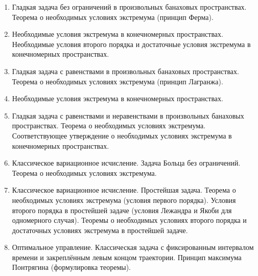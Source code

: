 % 
%

\begin{enumerate}
\item Гладкая задача без ограничений в произвольных банаховых пространствах. Теорема о необходимых условиях экстремума (принцип Ферма).

\item Необходимые условия экстремума в конечномерных пространствах. Необходимые условия второго порядка и достаточные условия экстремума в конечномерных пространствах.

\item Гладкая задача с равенствами в произвольных банаховых пространствах. Теорема о необходимых условиях экстремума (принцип Лагранжа).

\item Необходимые условия экстремума в конечномерных пространствах.

\item Гладкая задача с равенствами и неравенствами в произвольных банаховых пространствах. Теорема о необходимых условиях экстремума. Соответствующее утверждение о необходимых условиях экстремума в конечномерных пространствах.

\item Классическое вариационное исчисление. Задача Больца без ограничений. Теорема о необходимых условиях экстремума.

\item Классическое вариационное исчисление. Простейшая задача. Теорема о необходимых условиях экстремума (условия первого порядка). Условия второго порядка в простейшей задаче (условия Лежандра и Якоби для одномерного случая). Теоремы о необходимых условиях второго порядка и достаточных условиях экстремума в простейшей задаче.

\item Оптимальное управление. Классическая задача с фиксированным интервалом времени и закреплённым левым концом траектории. Принцип максимума Понтрягина (формулировка теоремы).
\end{enumerate}